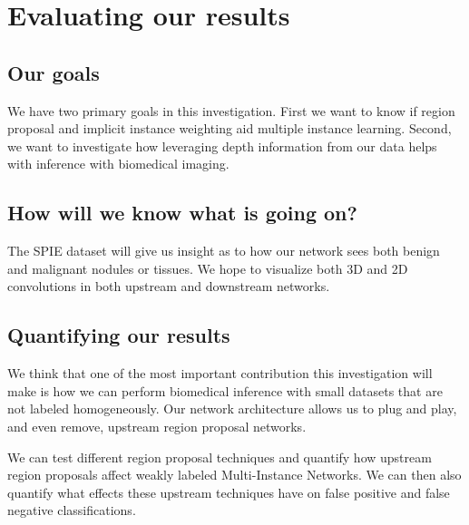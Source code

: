 \documentclass[twocolumn,10pt]{article}
\newcommand{\red}[1]{{\color{red}#1}}
\newcommand{\temp}[1]{{\red{#1}\\}}
\begin{document}
\section{Evaluating our results}

\subsection{Our goals}
We have two primary goals in this investigation. First we want to know if region
proposal and implicit instance weighting aid multiple instance learning. Second,
we want to investigate how leveraging depth information from our data helps
with inference with biomedical imaging.

\subsection{How will we know what is going on?}

The SPIE dataset will give us insight as to how our network sees both benign
and malignant nodules or tissues. We hope to visualize both 3D and 2D convolutions
in both upstream and downstream networks.

\subsection{Quantifying our results}

We think that one of the most important contribution this investigation will make
is how we can perform biomedical inference with small datasets that are not
labeled homogeneously.
Our network architecture allows us to plug and play, and even remove, upstream
region proposal networks. 

We can test different region proposal techniques and quantify how upstream
region proposals affect weakly labeled Multi-Instance Networks. We can then
also quantify what effects these upstream techniques have on false positive and
false negative classifications.
\end{document}
